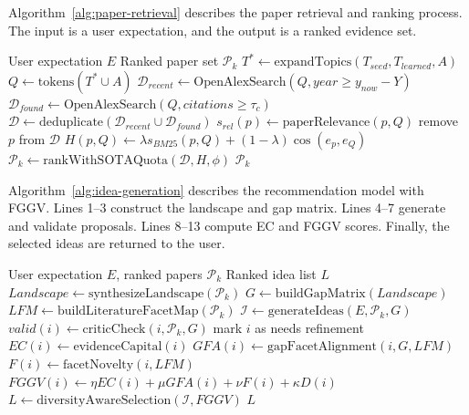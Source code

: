 \documentclass[preprint,12pt]{elsarticle}
\begin{document}
Algorithm~\ref{alg:paper-retrieval} describes the paper retrieval and ranking process. The input is a user expectation, and the output is a ranked evidence set.

\begin{algorithm}[t]
\caption{Paper retrieval and SOTA ranking}
\label{alg:paper-retrieval}
\begin{algorithmic}[1]
\Require User expectation $E$
\Ensure Ranked paper set $\mathcal{P}_k$
\State $T^* \gets \mathrm{expandTopics}(T_{seed}, T_{learned}, A)$
\State $Q \gets \mathrm{tokens}(T^* \cup A)$
\State $\mathcal{D}_{recent} \gets \mathrm{OpenAlexSearch}(Q, year \geq y_{now}-Y)$
\State $\mathcal{D}_{found} \gets \mathrm{OpenAlexSearch}(Q, citations \geq \tau_c)$
\State $\mathcal{D} \gets \mathrm{deduplicate}(\mathcal{D}_{recent} \cup \mathcal{D}_{found})$
  \State $s_{rel}(p) \gets \mathrm{paperRelevance}(p,Q)$
    \State remove $p$ from $\mathcal{D}$
  \EndIf
  \State $H(p,Q) \gets \lambda s_{BM25}(p,Q) + (1-\lambda)\cos(e_p,e_Q)$
\EndFor
\State $\mathcal{P}_k \gets \mathrm{rankWithSOTAQuota}(\mathcal{D},H,\phi)$
\State \Return $\mathcal{P}_k$
\end{algorithmic}
\end{algorithm}

Algorithm~\ref{alg:idea-generation} describes the recommendation model with FGGV. Lines 1--3 construct the landscape and gap matrix. Lines 4--7 generate and validate proposals. Lines 8--13 compute EC and FGGV scores. Finally, the selected ideas are returned to the user.

\begin{algorithm}[t]
\caption{Research idea recommendation with FGGV}
\label{alg:idea-generation}
\begin{algorithmic}[1]
\Require User expectation $E$, ranked papers $\mathcal{P}_k$
\Ensure Ranked idea list $L$
\State $Landscape \gets \mathrm{synthesizeLandscape}(\mathcal{P}_k)$
\State $G \gets \mathrm{buildGapMatrix}(Landscape)$
\State $LFM \gets \mathrm{buildLiteratureFacetMap}(\mathcal{P}_k)$
\State $\mathcal{I} \gets \mathrm{generateIdeas}(E,\mathcal{P}_k,G)$
  \State $valid(i) \gets \mathrm{criticCheck}(i,\mathcal{P}_k,G)$
    \State mark $i$ as needs refinement
  \EndIf
  \State $EC(i) \gets \mathrm{evidenceCapital}(i)$
  \State $GFA(i) \gets \mathrm{gapFacetAlignment}(i,G,LFM)$
  \State $F(i) \gets \mathrm{facetNovelty}(i,LFM)$
  \State $FGGV(i) \gets \eta EC(i)+\mu GFA(i)+\nu F(i)+\kappa D(i)$
\EndFor
\State $L \gets \mathrm{diversityAwareSelection}(\mathcal{I},FGGV)$
\State \Return $L$
\end{algorithmic}
\end{algorithm}
\end{document}
